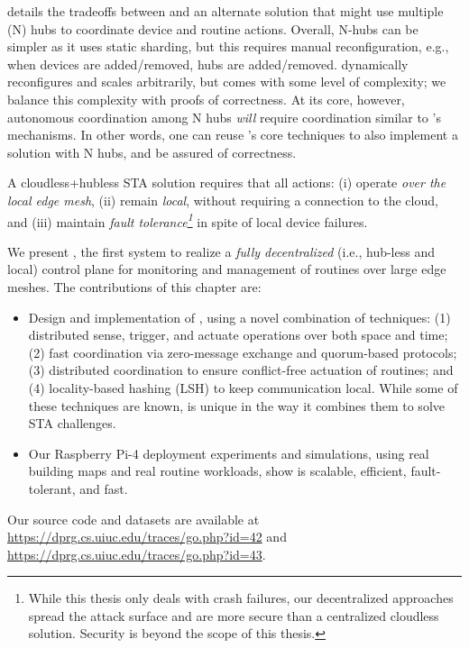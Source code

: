  details the tradeoffs between \sysname{} and an alternate solution that might use multiple (N) hubs to coordinate device and routine actions. Overall, N-hubs can be simpler as it uses static sharding, but this requires manual reconfiguration, e.g., when devices are added/removed, hubs are added/removed. \sysname{} dynamically reconfigures and scales arbitrarily, but comes with some level of complexity; we balance this complexity with proofs of correctness. At its core, however, autonomous coordination among N hubs {\it will} require coordination similar to \sysname's mechanisms. In other words, one can reuse \sysname's core techniques to also implement a solution with N hubs, and be assured of correctness.


A cloudless+hubless STA solution requires that all actions: 
(i) operate {\it over the local edge mesh}, (ii)  remain {\it local}, without requiring a connection to the cloud, and (iii) maintain {\it fault tolerance\footnote{While this thesis only deals with crash failures, our decentralized approaches spread the attack surface and are more secure than a centralized cloudless solution. Security is beyond the scope of this thesis.}} in spite of local device failures.  



 We present \sysname, the first system to realize
a {\it fully decentralized} (i.e., hub-less and local)    control plane for  monitoring and management of  routines
over large edge meshes. The contributions of this chapter are: 
\begin{itemize}
    \item Design and implementation of \sysname, using 
    a novel combination of techniques: 
    (1)
    distributed sense, trigger, and actuate
    operations over both space and time; 
    (2) fast coordination via zero-message exchange and quorum-based protocols; (3) distributed coordination to ensure conflict-free actuation of routines; and (4) locality-based hashing (LSH) to keep communication local. While some of these techniques are known, \sysname{} is unique in the way it combines them to solve  STA challenges.
    \item Our Raspberry Pi-4 deployment experiments and
    simulations, using real building maps and real
    routine workloads, show
    \sysname{} is scalable, efficient,  fault-tolerant, and fast.
\end{itemize}
Our source code and datasets are available at \href{dprg.cs.uiuc.edu/traces/go.php?id=42}{https://dprg.cs.uiuc.edu/traces/go.php?id=42} and \href{dprg.cs.uiuc.edu/traces/go.php?id=43}{https://dprg.cs.uiuc.edu/traces/go.php?id=43}.

